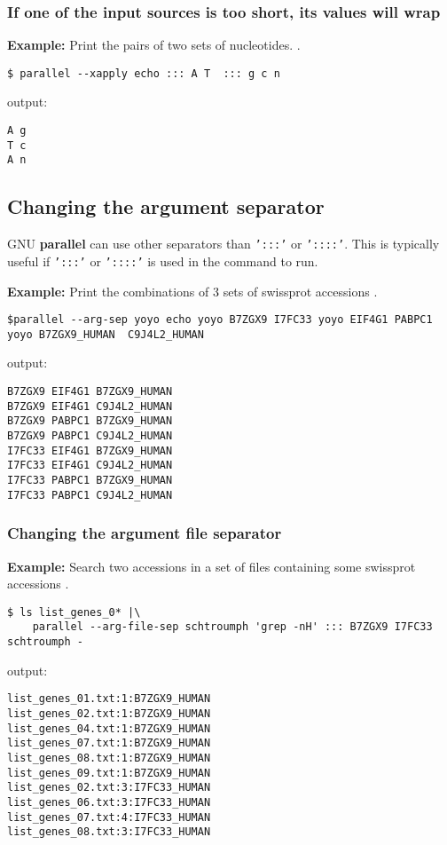 \documentclass{article}
\newcommand{\example}[1]{
\textbf{Example: } {\color[rgb]{0,0,1} #1 } .
}
\newcommand{\cmdoption}[1]{\texttt{'#1'}}
\def\prl{\textbf{parallel}}
\begin{document}
\subsubsection{If one of the input sources is too short, its values will wrap}
\example{Print the pairs of two sets of nucleotides. }
\begin{lstlisting}
$ parallel --xapply echo ::: A T  ::: g c n
\end{lstlisting}
output:
\begin{lstlisting}
A g
T c
A n
\end{lstlisting}

\subsection{Changing the argument separator}
GNU \prl{} can use other separators than \cmdoption{:::} or \cmdoption{::::}. This is typically useful if \cmdoption{:::} or \cmdoption{::::} is used in the command to run.
\example{Print the combinations of 3 sets of swissprot accessions }
\begin{lstlisting}
$parallel --arg-sep yoyo echo yoyo B7ZGX9 I7FC33 yoyo EIF4G1 PABPC1 yoyo B7ZGX9_HUMAN  C9J4L2_HUMAN
\end{lstlisting}
output:
\begin{lstlisting}
B7ZGX9 EIF4G1 B7ZGX9_HUMAN
B7ZGX9 EIF4G1 C9J4L2_HUMAN
B7ZGX9 PABPC1 B7ZGX9_HUMAN
B7ZGX9 PABPC1 C9J4L2_HUMAN
I7FC33 EIF4G1 B7ZGX9_HUMAN
I7FC33 EIF4G1 C9J4L2_HUMAN
I7FC33 PABPC1 B7ZGX9_HUMAN
I7FC33 PABPC1 C9J4L2_HUMAN
\end{lstlisting}
\subsubsection{Changing the argument file separator}
\example{Search two accessions in a set of files containing some  swissprot accessions }
\begin{lstlisting}
$ ls list_genes_0* |\
	parallel --arg-file-sep schtroumph 'grep -nH' ::: B7ZGX9 I7FC33 schtroumph -
\end{lstlisting}
output:
\begin{lstlisting}
list_genes_01.txt:1:B7ZGX9_HUMAN
list_genes_02.txt:1:B7ZGX9_HUMAN
list_genes_04.txt:1:B7ZGX9_HUMAN
list_genes_07.txt:1:B7ZGX9_HUMAN
list_genes_08.txt:1:B7ZGX9_HUMAN
list_genes_09.txt:1:B7ZGX9_HUMAN
list_genes_02.txt:3:I7FC33_HUMAN
list_genes_06.txt:3:I7FC33_HUMAN
list_genes_07.txt:4:I7FC33_HUMAN
list_genes_08.txt:3:I7FC33_HUMAN
\end{lstlisting}
\end{document}
